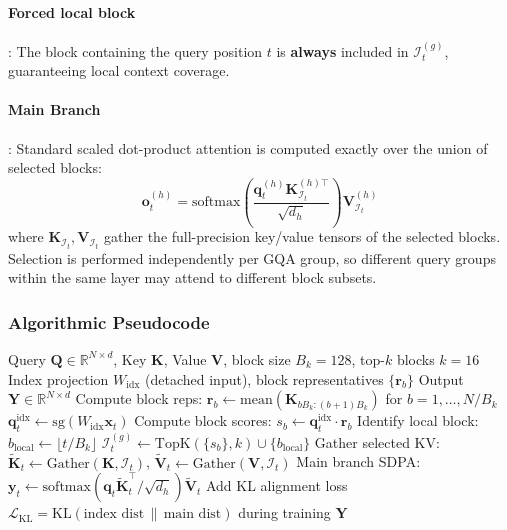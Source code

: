\paragraph{Forced local block}: The block containing the query position $t$ is \textbf{always} included in $\mathcal{I}_t^{(g)}$, guaranteeing local context coverage.

\paragraph{Main Branch}: Standard scaled dot-product attention is computed exactly over the union of selected blocks:
\[
\mathbf{o}_t^{(h)} = \mathrm{softmax}\left(\frac{\mathbf{q}_t^{(h)} \mathbf{K}_{\mathcal{I}_t}^{(h)\top}}{\sqrt{d_h}}\right) \mathbf{V}_{\mathcal{I}_t}^{(h)}
\]
where $\mathbf{K}_{\mathcal{I}_t}, \mathbf{V}_{\mathcal{I}_t}$ gather the full-precision key/value tensors of the selected blocks. Selection is performed independently per GQA group, so different query groups within the same layer may attend to different block subsets.

\subsubsection{Algorithmic Pseudocode}

\begin{algorithm}[H]
\caption{MSA: MiniMax Sparse Attention with Index + Main Branches}
\begin{algorithmic}[1]
\Require Query $\mathbf{Q} \in \mathbb{R}^{N \times d}$, Key $\mathbf{K}$, Value $\mathbf{V}$, block size $B_k = 128$, top-$k$ blocks $k = 16$
\Require Index projection $W_{\text{idx}}$ (detached input), block representatives $\{\mathbf{r}_b\}$
\Ensure Output $\mathbf{Y} \in \mathbb{R}^{N \times d}$
\State Compute block reps: $\mathbf{r}_b \gets \mathrm{mean}(\mathbf{K}_{bB_k:(b+1)B_k})$ for $b = 1, \ldots, N/B_k$
        \State $\mathbf{q}_t^{\text{idx}} \gets \mathrm{sg}(W_{\text{idx}} \mathbf{x}_t)$ 
        \State Compute block scores: $s_b \gets \mathbf{q}_t^{\text{idx}} \cdot \mathbf{r}_b$
        \State Identify local block: $b_{\text{local}} \gets \lfloor t / B_k \rfloor$
        \State $\mathcal{I}_t^{(g)} \gets \mathrm{TopK}(\{s_b\}, k) \cup \{b_{\text{local}}\}$ 
    \EndFor
    \State Gather selected KV: $\tilde{\mathbf{K}}_t \gets \mathrm{Gather}(\mathbf{K}, \mathcal{I}_t)$, $\tilde{\mathbf{V}}_t \gets \mathrm{Gather}(\mathbf{V}, \mathcal{I}_t)$
    \State Main branch SDPA: $\mathbf{y}_t \gets \mathrm{softmax}(\mathbf{q}_t \tilde{\mathbf{K}}_t^\top / \sqrt{d_h}) \tilde{\mathbf{V}}_t$
\EndFor
\State Add KL alignment loss $\mathcal{L}_{\text{KL}} = \mathrm{KL}(\text{index dist} \,\|\, \text{main dist})$ during training
\Return $\mathbf{Y}$
\end{algorithmic}
\end{algorithm}

